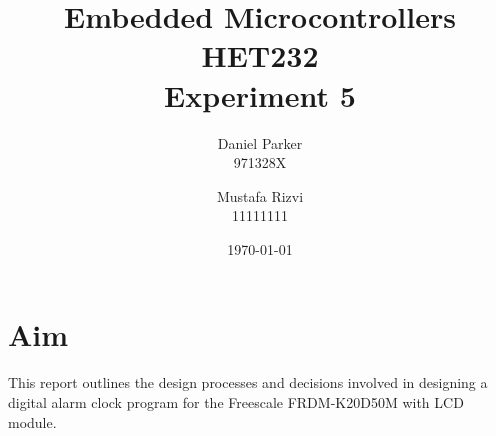 \documentclass{article}
\title{Embedded Microcontrollers HET232 \\ Experiment 5}
\author{Daniel Parker \\ 971328X \and Mustafa Rizvi \\ 11111111}
\date{\today}
\begin{document}
\maketitle
\section{Aim}
This report outlines the design processes and decisions involved in designing a digital alarm clock program for the Freescale FRDM-K20D50M with LCD module.
\end{document}
